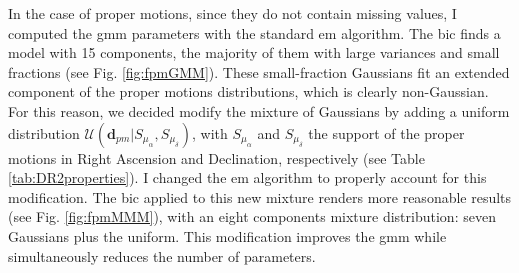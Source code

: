 In the case of proper motions, since they do not contain missing values, I computed the \gls{gmm} parameters with the standard \gls{em} algorithm. The \gls{bic} finds a model with 15 components, the majority of them with large variances and small fractions (see Fig. \ref{fig:fpmGMM}). These small-fraction Gaussians fit an extended component of the proper motions distributions, which is clearly non-Gaussian. For this reason, we decided modify the mixture of Gaussians by adding a uniform distribution $\mathcal{U}(\mathbf{d}_{pm}|S_{\mu_{\alpha}},S_{\mu_{\delta}})$, with $S_{\mu_{\alpha}}$ and $S_{\mu_{\delta}}$ the support of the proper motions in Right Ascension and Declination, respectively (see Table \ref{tab:DR2properties}). I changed the \gls{em} algorithm to properly account for this modification. The \gls{bic} applied to this new mixture renders more reasonable results (see Fig. \ref{fig:fpmMMM}), with an eight components mixture distribution: seven Gaussians plus the uniform. This modification improves the \gls{gmm} while simultaneously reduces the number of parameters.

